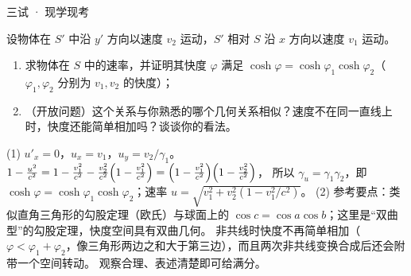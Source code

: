 \documentclass[cjk=noto, seal=first]{mojing-exam}
\begin{document}
\begin{paper}[time={建议 2.5 小时，含阅读（训练设置）}, full=100]{三试 · 现学现考}
\begin{questions}
\question[10] 设物体在 $S'$ 中沿 $y'$ 方向以速度 $v_2$ 运动，$S'$ 相对 $S$ 沿 $x$ 方向以速度 $v_1$ 运动。
\begin{enumerate}
  \item 求物体在 $S$ 中的速率，并证明其快度 $\varphi$ 满足 $\cosh\varphi=\cosh\varphi_1\cosh\varphi_2$（$\varphi_1,\varphi_2$ 分别为 $v_1,v_2$ 的快度）；
  \item （开放问题）这个关系与你熟悉的哪个几何关系相似？速度不在同一直线上时，快度还能简单相加吗？谈谈你的看法。
\end{enumerate}
\answerspace{3cm}
\begin{solution}
(1) $u'_x=0$，$u_x=v_1$，$u_y=v_2/\gamma_1$。$1-\frac{u^2}{c^2}=1-\frac{v_1^2}{c^2}-\frac{v_2^2}{c^2}\Bigl(1-\frac{v_1^2}{c^2}\Bigr)=\Bigl(1-\frac{v_1^2}{c^2}\Bigr)\Bigl(1-\frac{v_2^2}{c^2}\Bigr)$，
所以 $\gamma_u=\gamma_1\gamma_2$，即 $\cosh\varphi=\cosh\varphi_1\cosh\varphi_2$；速率 $u=\sqrt{v_1^2+v_2^2(1-v_1^2/c^2)}$。
(2) 参考要点：类似直角三角形的勾股定理（欧氏）与球面上的 $\cos c=\cos a\cos b$；这里是“双曲型”的勾股定理，快度空间具有双曲几何。
非共线时快度不再简单相加（$\varphi<\varphi_1+\varphi_2$，像三角形两边之和大于第三边），而且两次非共线变换合成后还会附带一个空间转动。
观察合理、表述清楚即可给满分。
\end{solution}
\end{questions}

\end{paper}
\end{document}
